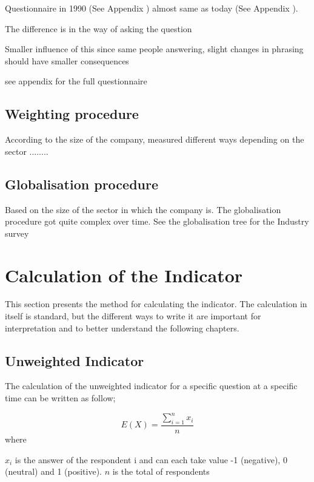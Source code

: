\documentclass[12pt,a4paper,oneside]{book}
\begin{document}
Questionnaire in 1990 (See Appendix ) almost same as today  (See Appendix ). 

The difference is in the way of asking the question

Smaller influence of this since same people answering, slight changes in phrasing should have smaller consequences

see appendix  for the full questionnaire


\subsection{Weighting procedure}
\label{sec:Weighting procedure}

According to the size of the company, measured different ways depending on the sector ........

\subsection{Globalisation procedure}
\label{sec:Globalisation procedure}
Based on the size of the sector in which the company is.
The globalisation procedure got quite complex over time. See the globalisation tree for the Industry survey 


\newpage
\section{Calculation of the Indicator}

This section presents the method for calculating the indicator. 
The calculation in itself is standard, but the different ways to write it are important for interpretation and to better understand the following chapters.

\subsection{Unweighted Indicator}

The calculation of the unweighted indicator for a specific question at a specific time can be written as follow;

\begin{equation}
    E(X) = \frac{ \sum_{i=1}^n x_i}{n}
\end{equation} 
where 

$x_i$ is the answer of the respondent i and can each take value -1 (negative), 0 (neutral) and 1 (positive). 
$n$ is the total of respondents
\end{document}
